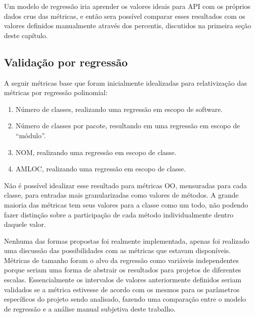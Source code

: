 Um modelo de regressão iria aprender os valores ideais para API com os próprios dados crus das métricas, e então sera possível comparar esses resultados com os valores definidos manualmente através dos percentis, discutidos na primeira seção deste capítulo.



\subsection{Validação por regressão}

A seguir métricas base que foram inicialmente idealizadas para relativização das métricas por regressão polinomial:

\begin{enumerate}
\item Número de classes, realizando uma regressão em escopo de software.
\item Número de classes por pacote, resultando em uma regressão em escopo de ``módulo''.
\item NOM, realizando uma regressão em escopo de classe.
\item AMLOC, realizando uma regressão em escopo de classe.
\end{enumerate}

Não é possível idealizar esse resultado para métricas OO, mensuradas para cada classe, para entradas mais granularizadas como valores de métodos. A grande maioria das métricas tem seus valores para a classe como um todo, não podendo fazer distinção sobre a participação de cada método individualmente dentro daquele valor.

Nenhuma das formas propostas foi realmente implementada, apenas foi realizado uma discussão das possibilidades com as métricas que estavam disponíveis. Métricas de tamanho foram o alvo da regressão como variáveis independentes porque seriam uma forma de abstrair os resultados para projetos de diferentes escalas. Essencialmente os intervalos de valores anteriormente definidos seriam validados se a métrica estivesse de acordo com os mesmos para os parâmetros específicos do projeto sendo analisado, fazendo uma comparação entre o modelo de regressão e a análise manual subjetiva deste trabalho.

